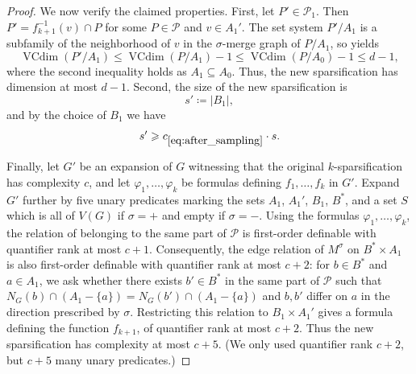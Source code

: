 \documentclass[11pt]{article}
\theoremstyle{definition}
\newcommand{\inducedSS}[2]{#1/#2}%
\renewcommand{\le}{\leqslant}
\renewcommand{\ge}{\geqslant}
\renewcommand{\subset}{\subseteq}
\newcommand{\set}[1]{\{#1\}}
\renewcommand{\cal}{\mathcal}
\DeclareMathOperator{\VCdim}{VCdim}
\let\phi\varphi
\begin{document}
\begin{proof}
We now verify the claimed properties.
First, let $P'\in\cal P_1$.
Then $P'=f_{k+1}^{-1}(v)\cap P$ for some $P\in\cal P$ and $v\in A_1'$.
The set system $\inducedSS{P'}{A_1}$ is a subfamily of the neighborhood of $v$
in the $\sigma$-merge graph of $\inducedSS{P}{A_1}$, so
 yields
\[
  \VCdim(\inducedSS{P'}{A_1})\le \VCdim(\inducedSS{P}{A_1}) - 1 \le \VCdim(\inducedSS{P}{A_0}) - 1 \le d-1,
\]
where the second inequality holds as $A_1\subset A_0$.
Thus, the new sparsification has dimension at most $d-1$.
Second, the size of the new sparsification is
\[
  s'\coloneqq |B_1|,
\]
and by the choice of $B_1$ we have
\[
  s' \ge c_{\cref{eq:after_sampling}} \cdot s.
\]

Finally, let $G'$ be an expansion of $G$ witnessing that the original
$k$-sparsification has complexity $c$,
and let $\phi_1,\ldots,\phi_k$ be formulas defining
$f_1,\ldots,f_k$ in $G'$.
Expand $G'$ further by five unary predicates marking the sets
$A_1$, $A_1'$, $B_1$, $B^*$, and a set $S$ which is all of $V(G)$ if
$\sigma=+$ and empty if $\sigma=-$.
Using the formulas $\phi_1,\ldots,\phi_k$, the relation of belonging to the
same part of $\cal P$ is first-order definable with quantifier rank at most
$c+1$.
Consequently, the edge relation of $M^\sigma$ on $B^*\times A_1$ is also
first-order definable with quantifier rank at most $c+2$:
for $b\in B^*$ and $a\in A_1$, we ask whether there exists
$b'\in B^*$ in the same part of $\cal P$ such that
$N_G(b)\cap (A_1-\set{a})=N_G(b')\cap (A_1-\set{a})$ and
$b,b'$ differ on $a$ in the direction prescribed by $\sigma$.
Restricting this relation to $B_1\times A_1'$ gives a formula defining the
function $f_{k+1}$, of quantifier rank at most $c+2$.
Thus the new sparsification has complexity at most $c+5$.
(We only used quantifier rank $c + 2$, but $c+5$ many unary predicates.)
\end{proof}
\end{document}
